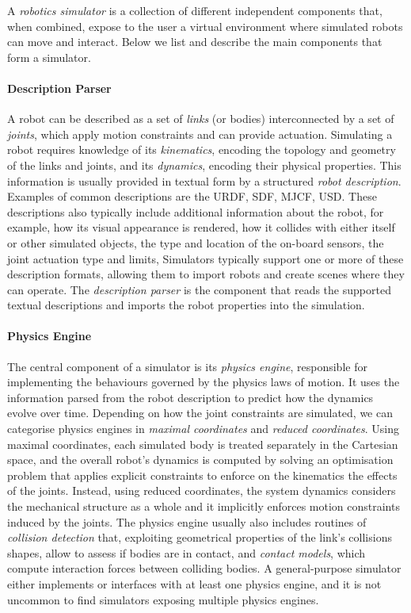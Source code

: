 A \emph{robotics simulator} is a collection of different independent components that, when combined, expose to the user a virtual environment where simulated robots can move and interact.
Below we list and describe the main components that form a simulator.

\paragraph{Description Parser}

A robot can be described as a set of \emph{links} (or bodies) interconnected by a set of \emph{joints}, which apply motion constraints and can provide actuation.
Simulating a robot requires knowledge of its \emph{kinematics}, encoding the topology and geometry of the links and joints, and its \emph{dynamics}, encoding their physical properties.
This information is usually provided in textual form by a structured \emph{robot description}.
Examples of common descriptions are the \ac{URDF}, \ac{SDF}, \ac{MJCF}, \ac{USD}.
These descriptions also typically include additional information about the robot, for example, how its visual appearance is rendered, how it collides with either itself or other simulated objects, the type and location of the on-board sensors, the joint actuation type and limits, \etc
Simulators typically support one or more of these description formats, allowing them to import robots and create scenes where they can operate.
The \emph{description parser} is the component that reads the supported textual descriptions and imports the robot properties into the simulation.

\paragraph{Physics Engine}

The central component of a simulator is its \emph{physics engine}, responsible for implementing the behaviours governed by the physics laws of motion.
It uses the information parsed from the robot description to predict how the dynamics evolve over time.
Depending on how the joint constraints are simulated, we can categorise physics engines in \emph{maximal coordinates} and \emph{reduced coordinates}.
Using maximal coordinates, each simulated body is treated separately in the Cartesian space, and the overall robot's dynamics is computed by solving an optimisation problem that applies explicit constraints to enforce on the kinematics the effects of the joints.
Instead, using reduced coordinates, the system dynamics considers the mechanical structure as a whole and it implicitly enforces motion constraints induced by the joints.
The physics engine usually also includes routines of \emph{collision detection} that, exploiting geometrical properties of the link's collisions shapes, allow to assess if bodies are in contact, and \emph{contact models}, which compute interaction forces between colliding bodies.
A general-purpose simulator either implements or interfaces with at least one physics engine, and it is not uncommon to find simulators exposing multiple physics engines.

